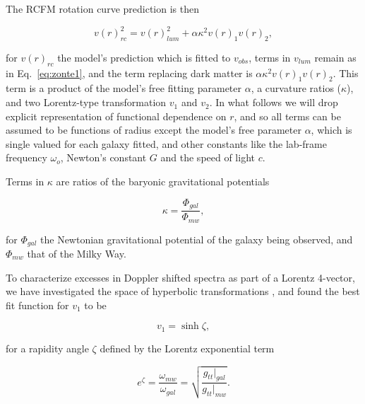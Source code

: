 \documentclass[reprint,%
 amsmath,amssymb,
 aps,
]{revtex4-1}
\begin{document}
 
 
   
   The   RCFM rotation curve prediction is then
   

\begin{equation}
v(r)_{rc}^2 =  v(r)_{lum}^2+\alpha \kappa^2 v(r)_{1} v(r)_{2},  
\label{eq:zonteLCM}
\end{equation}  

for $v(r)_{rc}$ the model's prediction which is fitted to $v_{obs}$, terms in $v_{lum}$ remain   as in 
  Eq.~\ref{eq:zonte1}, and the   term   replacing  dark matter is  $\alpha \kappa^2 v(r)_{1} v(r)_{2}$. This term is a product of the model's free fitting parameter $\alpha$, a curvature ratios ($\kappa$),  and two Lorentz-type transformation $v_1$ and $v_2$. 
  In what follows we will drop explicit representation of functional dependence on $r$, and so all   terms  can be assumed to  be functions of radius except the model's free parameter $\alpha$,  which is single valued for each galaxy fitted, and other constants like the lab-frame frequency $\omega_o$, Newton's constant $G$ and the speed of light $c$.  
  
  Terms in 
$\kappa$  are   ratios of the baryonic gravitational potentials 

 \begin{equation}
\kappa=\frac{\Phi_{gal}}{\Phi_{mw}}, 
\label{eq:kappa2}  
\end{equation}  

 for $\Phi_{gal}$ the    Newtonian gravitational potential of the galaxy being observed, and $\Phi_{mw}$ that of  the Milky Way.  
 
 
 To characterize    excesses in Doppler shifted spectra
  as     part of  a Lorentz 4-vector, we have investigated the space of hyperbolic transformations  \cite{Cisneros:2013vha,Cisneros:2014fea,Cisneros2015,Cisn2016}, and found the best fit function for $v_1$ to be

 
 
   \begin{equation}
       v_1 = \sinh \zeta, 
       \label{eq:hyperbolica}
   \end{equation}
 
 for a rapidity angle $\zeta$  defined by the    Lorentz exponential  term  
  
   
     \begin{equation}
     e^{\zeta}=  \frac{\omega_{mw}}{\omega_{gal}}  =\sqrt{\frac{g_{tt}|_{gal}}{g_{tt}|_{mw}}}.
      \label{eq:gravRS}
    \end{equation}
    
\end{document}
